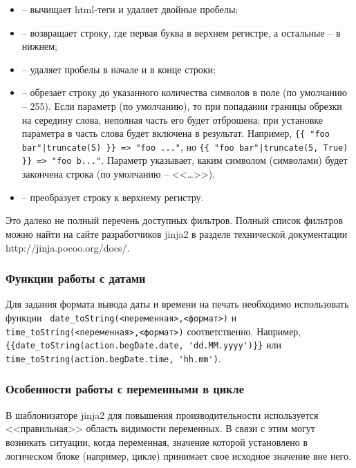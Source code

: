 \begin{itemize}
 \item {} – вычищает html-теги и удаляет двойные пробелы;
 \item {} – возвращает строку, где первая буква в верхнем регистре, а остальные – в нижнем;
 \item {} – удаляет пробелы в начале и в конце строки;
 \item {} – обрезает строку до указанного количества символов в поле  (по умолчанию – 255). Если параметр  (по умолчанию), то при попадании границы обрезки на середину слова, неполная часть его будет отброшена; при установке параметра в  часть слова будет включена в результат. Например, \verb/{{ "foo bar"|truncate(5) }} => "foo ..."/, но \verb/{{ "foo bar"|truncate(5, True) }} => "foo b..."/. Параметр  указывает, каким символом (символами) будет закончена строка (по умолчанию – <<…>>).
 \item {} – преобразует строку к верхнему регистру.
\end{itemize}
 
Это далеко не полный перечень доступных фильтров. Полный список фильтров можно найти на сайте разработчиков jinja2 в разделе технической документации http://jinja.pocoo.org/docs/.

\subsubsection{Функции работы с датами}

Для задания формата вывода даты и времени на печать необходимо использовать функции \verb| date_toString(<переменная>,<формат>)| и \verb|time_toString(<переменная>,<формат>)| соответственно. Например, \verb|{{date_toString(action.begDate.date, 'dd.MM.yyyy')}}| или \verb|time_toString(action.begDate.time, 'hh.mm')|.

\subsubsection{Особенности работы с переменными в цикле}

В шаблонизаторе jinja2 для повышения производительности используется <<правильная>> область видимости переменных. В связи с этим могут возникать ситуации, когда переменная, значение которой установлено в логическом блоке (например, цикле) принимает свое исходное значение вне него.

